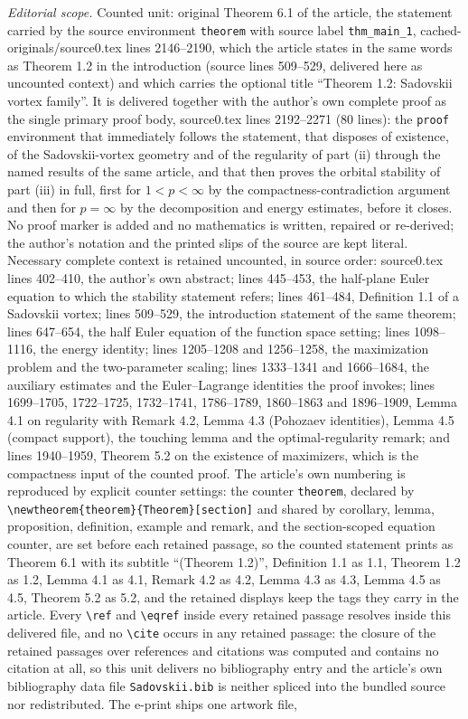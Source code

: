 \documentclass[10pt,a4paper]{amsart}
\theoremstyle{definition}
\theoremstyle{definition}
\numberwithin{equation}{section}
\newcommand{\0}{\emptyset}
\begin{document}
\noindent\textit{Editorial scope.} Counted unit: original Theorem 6.1 of the article, the statement carried by the source environment \texttt{theorem} with source label \texttt{thm\_main\_1}, cached-originals/source0.tex lines 2146--2190, which the article states in the same words as Theorem 1.2 in the introduction (source lines 509--529, delivered here as uncounted context) and which carries the optional title ``Theorem 1.2: Sadovskii vortex family''. It is delivered together with the author's own complete proof as the single primary proof body, source0.tex lines 2192--2271 (80 lines): the \texttt{proof} environment that immediately follows the statement, that disposes of existence, of the Sadovskii-vortex geometry and of the regularity of part (ii) through the named results of the same article, and that then proves the orbital stability of part (iii) in full, first for $1<p<\infty$ by the compactness-contradiction argument and then for $p=\infty$ by the decomposition and energy estimates, before it closes. No proof marker is added and no mathematics is written, repaired or re-derived; the author's notation and the printed slips of the source are kept literal. Necessary complete context is retained uncounted, in source order: source0.tex lines 402--410, the author's own abstract; lines 445--453, the half-plane Euler equation to which the stability statement refers; lines 461--484, Definition 1.1 of a Sadovskii vortex; lines 509--529, the introduction statement of the same theorem; lines 647--654, the half Euler equation of the function space setting; lines 1098--1116, the energy identity; lines 1205--1208 and 1256--1258, the maximization problem and the two-parameter scaling; lines 1333--1341 and 1666--1684, the auxiliary estimates and the Euler--Lagrange identities the proof invokes; lines 1699--1705, 1722--1725, 1732--1741, 1786--1789, 1860--1863 and 1896--1909, Lemma 4.1 on regularity with Remark 4.2, Lemma 4.3 (Pohozaev identities), Lemma 4.5 (compact support), the touching lemma and the optimal-regularity remark; and lines 1940--1959, Theorem 5.2 on the existence of maximizers, which is the compactness input of the counted proof. The article's own numbering is reproduced by explicit counter settings: the counter \texttt{theorem}, declared by \texttt{\textbackslash newtheorem\{theorem\}\{Theorem\}[section]} and shared by corollary, lemma, proposition, definition, example and remark, and the section-scoped equation counter, are set before each retained passage, so the counted statement prints as Theorem 6.1 with its subtitle ``(Theorem 1.2)'', Definition 1.1 as 1.1, Theorem 1.2 as 1.2, Lemma 4.1 as 4.1, Remark 4.2 as 4.2, Lemma 4.3 as 4.3, Lemma 4.5 as 4.5, Theorem 5.2 as 5.2, and the retained displays keep the tags they carry in the article. Every \texttt{\textbackslash ref} and \texttt{\textbackslash eqref} inside every retained passage resolves inside this delivered file, and no \texttt{\textbackslash cite} occurs in any retained passage: the closure of the retained passages over references and citations was computed and contains no citation at all, so this unit delivers no bibliography entry and the article's own bibliography data file \texttt{Sadovskii.bib} is neither spliced into the bundled source nor redistributed. The e-print ships one artwork file, 
\end{document}
